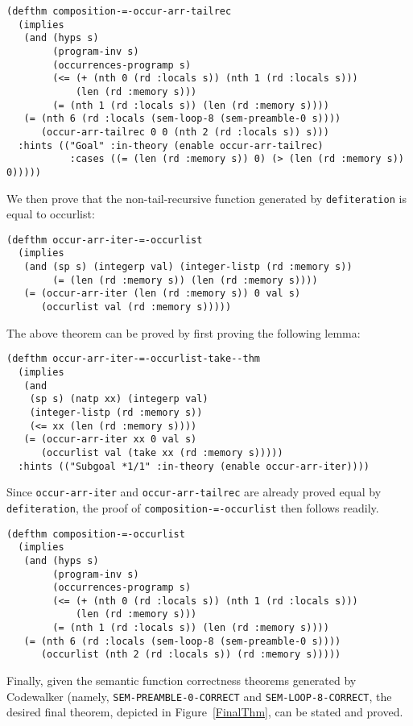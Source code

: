 \documentclass{eptcs}
\begin{document}
\begin{verbatim}
(defthm composition-=-occur-arr-tailrec
  (implies
   (and (hyps s)
        (program-inv s)
        (occurrences-programp s)
        (<= (+ (nth 0 (rd :locals s)) (nth 1 (rd :locals s))) 
            (len (rd :memory s)))
        (= (nth 1 (rd :locals s)) (len (rd :memory s))))
   (= (nth 6 (rd :locals (sem-loop-8 (sem-preamble-0 s))))
      (occur-arr-tailrec 0 0 (nth 2 (rd :locals s)) s)))
  :hints (("Goal" :in-theory (enable occur-arr-tailrec)
           :cases ((= (len (rd :memory s)) 0) (> (len (rd :memory s)) 0)))))
\end{verbatim}

We then prove that the non-tail-recursive function generated by
\texttt{defiteration} is equal to occurlist:

\begin{verbatim}
(defthm occur-arr-iter-=-occurlist
  (implies
   (and (sp s) (integerp val) (integer-listp (rd :memory s))
        (= (len (rd :memory s)) (len (rd :memory s))))
   (= (occur-arr-iter (len (rd :memory s)) 0 val s)
      (occurlist val (rd :memory s)))))
\end{verbatim}

The above theorem can be proved by first proving the following lemma:

\begin{verbatim}
(defthm occur-arr-iter-=-occurlist-take--thm
  (implies
   (and
    (sp s) (natp xx) (integerp val) 
    (integer-listp (rd :memory s))
    (<= xx (len (rd :memory s))))
   (= (occur-arr-iter xx 0 val s)
      (occurlist val (take xx (rd :memory s)))))
  :hints (("Subgoal *1/1" :in-theory (enable occur-arr-iter))))
\end{verbatim}

Since \texttt{occur-arr-iter} and \texttt{occur-arr-tailrec} are
already proved equal by \texttt{defiteration}, the proof of 
\texttt{composition-=-occurlist} then follows readily.

\begin{verbatim}
(defthm composition-=-occurlist
  (implies
   (and (hyps s)
        (program-inv s)
        (occurrences-programp s)
        (<= (+ (nth 0 (rd :locals s)) (nth 1 (rd :locals s))) 
            (len (rd :memory s)))
        (= (nth 1 (rd :locals s)) (len (rd :memory s))))
   (= (nth 6 (rd :locals (sem-loop-8 (sem-preamble-0 s))))
      (occurlist (nth 2 (rd :locals s)) (rd :memory s)))))
\end{verbatim}

Finally, given the semantic function correctness theorems generated by 
Codewalker (namely, \texttt{SEM-PREAMBLE-0-CORRECT} and 
\texttt{SEM-LOOP-8-CORRECT}, the desired final theorem, 
depicted in Figure~\ref{FinalThm}, can be stated and proved.
\end{document}
